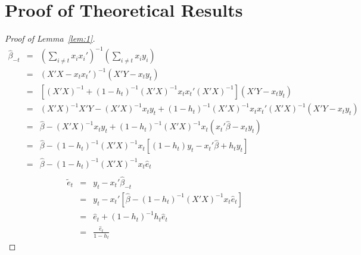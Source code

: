 \appendix
\section{Proof of Theoretical Results}
\begin{proof}[Proof of Lemma~\ref{lem:1}]
\begin{eqnarray}
 \hat{\beta}_{-t}
& = & (\sum_{i \neq t} x_i x_i')^{-1} (\sum_{i \neq t} x_i y_i) \nonumber \\
& = & (X'X - x_t x_t')^{-1} (X'Y - x_t y_t) \nonumber \\
& = & [(X'X)^{-1} + (1 - h_t)^{-1} (X'X)^{-1} x_t x_t' (X'X)^{-1}] (X'Y - x_t y_t)  \nonumber \\
& = & (X'X)^{-1}X'Y - (X'X)^{-1} x_t y_t + (1 - h_t)^{-1} (X'X)^{-1} x_t x_t' (X'X)^{-1} (X'Y - x_t y_t)  \nonumber \\
& = & \hat{\beta} - (X'X)^{-1} x_t y_t + (1 - h_t)^{-1} (X'X)^{-1} x_t (x_t' \hat{\beta} - x_t y_t) \nonumber \\
& = & \hat{\beta} - (1 - h_t)^{-1} (X'X)^{-1} x_t [(1 - h_t) y_t - x_t' \hat{\beta} + h_t y_t] \nonumber \\
& = & \hat{\beta} - (1 - h_t)^{-1} (X'X)^{-1} x_t \hat{e}_t  \nonumber \\
\end{eqnarray}
\begin{eqnarray}
 \tilde{e}_t
& = & y_t -x_t' \hat{\beta}_{-t} \nonumber \\
& = & y_t - x_t' [\hat{\beta} - (1 - h_t)^{-1} (X'X)^{-1} x_t \hat{e}_t ] \nonumber \\
& = & \hat{e}_t  + (1 - h_t)^{-1} h_t \hat{e}_t  \nonumber \\
& = & \frac{\hat{e}_t }{1 - h_t}
\end{eqnarray}
\end{proof}

